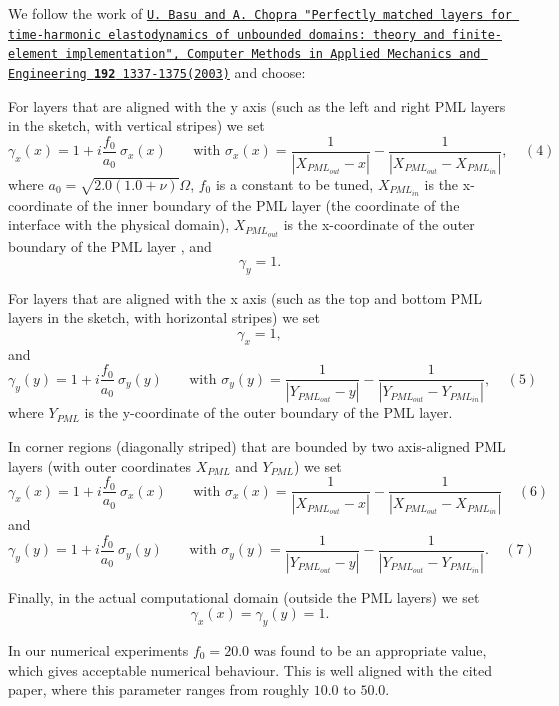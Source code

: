We follow the work of \href{http://www.sciencedirect.com/science/article/pii/S0045782502006424}{\tt U. Basu and A. Chopra "Perfectly matched layers for time-\/harmonic elastodynamics of unbounded domains\+: theory and finite-\/element implementation", Computer Methods in Applied Mechanics and Engineering {\bfseries 192} 1337-\/1375(2003)} and choose\+:
\begin{DoxyItemize}
\item For layers that are aligned with the y axis (such as the left and right P\+ML layers in the sketch, with vertical stripes) we set \[ \gamma_{x}(x) = 1 +i\frac{f_0}{a_0}\ \sigma_{x}(x) \ \ \ \ \ \ \ \mbox{ \ \ \ with \ \ \ } \sigma_{x}(x) = \frac{1}{|X_{PML_{out}}-x|}-\frac{1}{|X_{PML_{out}}-X_{PML_{in}}|}, \ \ \ \ \ (4) \] where $ a_0 = \sqrt{2.0(1.0+\nu)}\Omega$, $ f_0 $ is a constant to be tuned, $ X_{PML_{in}} $ is the x-\/coordinate of the inner boundary of the P\+ML layer (the coordinate of the interface with the physical domain), $ X_{PML_{out}} $ is the x-\/coordinate of the outer boundary of the P\+ML layer , and \[ \gamma_y = 1. \]
\item For layers that are aligned with the x axis (such as the top and bottom P\+ML layers in the sketch, with horizontal stripes) we set \[ \gamma_x = 1, \] and \[ \gamma_{y}(y) = 1+i\frac{f_0}{a_0} \ \sigma_{y}(y) \ \ \ \ \ \ \ \mbox{ \ \ \ with \ \ \ } \sigma_{y}(y) = \frac{1}{|Y_{PML_{out}}-y|}-\frac{1}{|Y_{PML_{out}}-Y_{PML_{in}}|}, \ \ \ \ \ (5) \] where $ Y_{PML} $ is the y-\/coordinate of the outer boundary of the P\+ML layer.
\item In corner regions (diagonally striped) that are bounded by two axis-\/aligned P\+ML layers (with outer coordinates $ X_{PML} $ and $ Y_{PML} $) we set \[ \gamma_{x}(x) = 1 +i\frac{f_0}{a_0}\ \sigma_{x}(x) \ \ \ \ \ \ \ \mbox{ \ \ \ with \ \ \ } \sigma_{x}(x) = \frac{1}{|X_{PML_{out}}-x|}-\frac{1}{|X_{PML_{out}}-X_{PML_{in}}|} \ \ \ \ \ (6) \] and \[ \gamma_{y}(y) = 1+i\frac{f_0}{a_0} \ \sigma_{y}(y) \ \ \ \ \ \ \ \mbox{ \ \ \ with \ \ \ } \sigma_{y}(y) = \frac{1}{|Y_{PML_{out}}-y|}-\frac{1}{|Y_{PML_{out}}-Y_{PML_{in}}|}. \ \ \ \ \ (7) \]
\item Finally, in the actual computational domain (outside the P\+ML layers) we set \[ \gamma_{x}(x) = \gamma_{y}(y) = 1. \]
\end{DoxyItemize}In our numerical experiments $ f_0 = 20.0 $ was found to be an appropriate value, which gives acceptable numerical behaviour. This is well aligned with the cited paper, where this parameter ranges from roughly $ 10.0 $ to $ 50.0 $.



